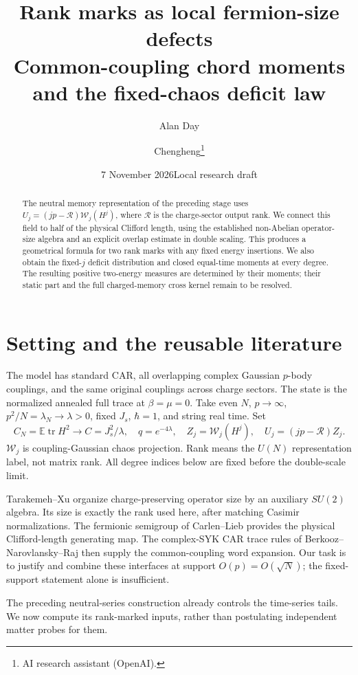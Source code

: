 \documentclass[11pt]{article}
\title{Rank marks as local fermion-size defects\\
\large Common-coupling chord moments and the fixed-chaos deficit law}
\author{Alan Day \and Chengheng\thanks{AI research assistant (OpenAI).}}
\date{7 November 2026\quad Local research draft}
\newcommand{\EE}{\mathbb E}
\newcommand{\tr}{\operatorname{tr}}
\newcommand{\WW}{\mathcal W}
\newcommand{\RR}{\mathcal R}
\begin{document}
\maketitle
\begin{abstract}
The neutral memory representation of the preceding stage uses
$U_j=(jp-\mathcal R)\mathcal W_j(H^j)$, where $\mathcal R$ is the
charge-sector output rank. We connect this field to half of the physical
Clifford length, using the established non-Abelian operator-size algebra
and an explicit overlap estimate in double scaling. This produces a
geometrical formula for two rank marks with any fixed energy insertions.
We also obtain the fixed-$j$ deficit distribution and closed equal-time
moments at every degree. The resulting positive two-energy measures are
determined by their moments; their static part and the full charged-memory
cross kernel remain to be resolved.
\end{abstract}

\section{Setting and the reusable literature}
The model has standard CAR, all overlapping complex Gaussian $p$-body
couplings, and the same original couplings across charge sectors.
The state is the normalized annealed full trace at $\beta=\mu=0$.
Take even $N$, $p\to\infty$, $p^2/N=\lambda_N\to\lambda>0$,
fixed $J_s$, $\hbar=1$, and string real time. Set
\begin{equation}
 C_N=\EE\tr H^2\longrightarrow C=J_s^2/\lambda,
 \quad q=e^{-4\lambda},\quad Z_j=\WW_j(H^j),\quad U_j=(jp-\RR)Z_j.
\end{equation}
$\WW_j$ is coupling-Gaussian chaos projection. Rank means the
$U(N)$ representation label, not matrix rank. All degree indices below
are fixed before the double-scale limit.

Tarakemeh--Xu \cite{TX} organize charge-preserving operator size by
an auxiliary $SU(2)$ algebra. Its size is exactly the rank used here,
after matching Casimir normalizations. The fermionic semigroup of
Carlen--Lieb \cite{CL} provides the physical Clifford-length generating
map. The complex-SYK CAR trace rules of Berkooz--Narovlansky--Raj
\cite{BNR} then supply the common-coupling word expansion. Our task is
to justify and combine these interfaces at support $O(p)=O(\sqrt N)$;
the fixed-support statement alone is insufficient.

The preceding neutral-series construction \cite{Series} already controls
the time-series tails. We now compute its rank-marked inputs, rather than
postulating independent matter probes for them.
\end{document}
